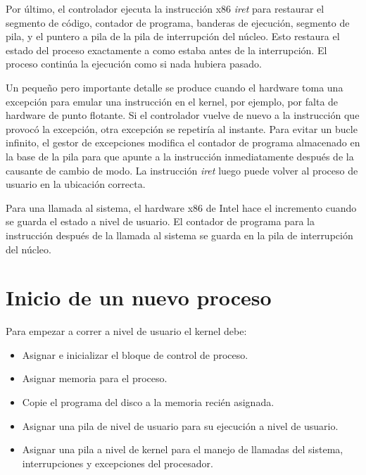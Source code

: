 \documentclass[10pt]{book}
\begin{document}
Por último, el controlador ejecuta la instrucción {\mf x86} \textit{iret} para restaurar el segmento de código, contador de programa, banderas de ejecución, segmento de pila, y el puntero a pila de la pila de interrupción del núcleo. Esto restaura el estado del proceso exactamente a como estaba antes de la interrupción. El proceso continúa la ejecución como si nada hubiera pasado.

Un pequeño pero importante detalle se produce cuando el hardware toma una excepción para emular una instrucción en el kernel, por ejemplo, por falta de hardware de punto flotante. Si el controlador vuelve de nuevo a la instrucción que provocó la excepción, otra excepción se repetiría al instante. Para evitar un bucle infinito, el gestor de excepciones modifica el contador de programa almacenado en la base de la pila para que apunte a la instrucción inmediatamente después de la causante de cambio de modo. La instrucción \textit{iret} luego puede volver al proceso de usuario en la ubicación correcta.

Para una llamada al sistema, el hardware {\mf x86} de Intel hace el incremento cuando se guarda el estado a nivel de usuario. El contador de programa para la instrucción después de la llamada al sistema se guarda en la pila de interrupción del núcleo.

\setcounter{subsection}{6}
\section{Inicio de un nuevo proceso}

Para empezar a correr a nivel de usuario el kernel debe:
\begin{itemize}
\item Asignar e inicializar el bloque de control de proceso.
\item Asignar memoria para el proceso.
\item Copie el programa del disco a la memoria recién asignada.
\item Asignar una pila de nivel de usuario para su ejecución a nivel de usuario.
\item Asignar una pila a nivel de kernel para el manejo de llamadas del sistema, interrupciones y excepciones del procesador.
\end{itemize}
\end{document}
